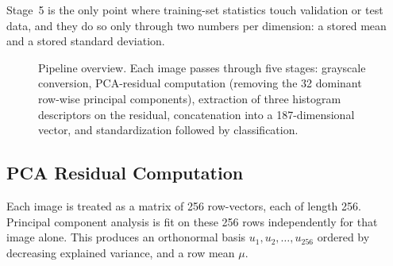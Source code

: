 \documentclass[runningheads]{llncs}
\begin{document}
Stage~5 is the only point where training-set statistics touch validation or test data, and they do so only through two numbers per dimension: a stored mean and a stored standard deviation.

\begin{figure}[t]
\centering
{}
\caption{Pipeline overview. Each image passes through five stages: grayscale conversion, PCA-residual computation (removing the 32 dominant row-wise principal components), extraction of three histogram descriptors on the residual, concatenation into a 187-dimensional vector, and standardization followed by classification.}
\label{fig:pipeline}
\end{figure}


\subsection{PCA Residual Computation}

Each image is treated as a matrix of 256 row-vectors, each of length 256. Principal component analysis is fit on these 256 rows independently for that image alone. This produces an orthonormal basis $u_1, u_2, \ldots, u_{256}$ ordered by decreasing explained variance, and a row mean $\mu$.
\end{document}
